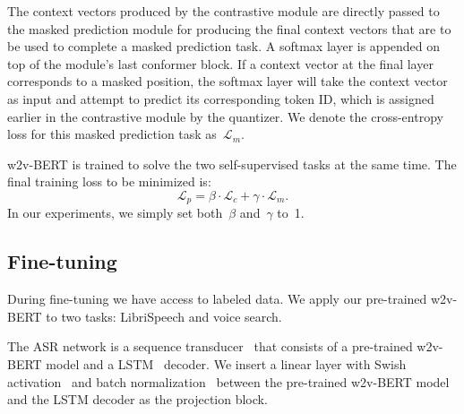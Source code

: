 \documentclass{article}
\begin{document}
The context vectors produced by the contrastive module are directly passed to the masked prediction module for producing the final context vectors that are to be used to complete a masked prediction task.
A softmax layer is appended on top of the module's last conformer block.
If a context vector at the final layer corresponds to a masked position, the softmax layer will take the context vector as input and attempt to predict its corresponding token ID, which is assigned earlier in the contrastive module by the quantizer.
We denote the cross-entropy loss for this masked prediction task as~$\mathcal{L}_{m}$.

w2v-BERT is trained to solve the two self-supervised tasks at the same time.
The final training loss to be minimized is:
\begin{equation}
  \mathcal{L}_{p} = \beta \cdot \mathcal{L}_{c} + \gamma \cdot \mathcal{L}_{m}.
\end{equation}
In our experiments, we simply set both~$\beta$ and~$\gamma$ to~1.

\subsection{Fine-tuning}
During fine-tuning we have access to labeled data.
We apply our pre-trained w2v-BERT to two tasks: LibriSpeech and voice search.

The ASR network is a sequence transducer~\cite{graves2012sequence} that consists of a pre-trained w2v-BERT model and a LSTM~\cite{hochreiter1997long} decoder.
We insert a linear layer with Swish activation~\cite{ramachandran2017searching} and batch normalization~\cite{ioffe2015batch} between the pre-trained w2v-BERT model and the LSTM decoder as the projection block.
\end{document}
